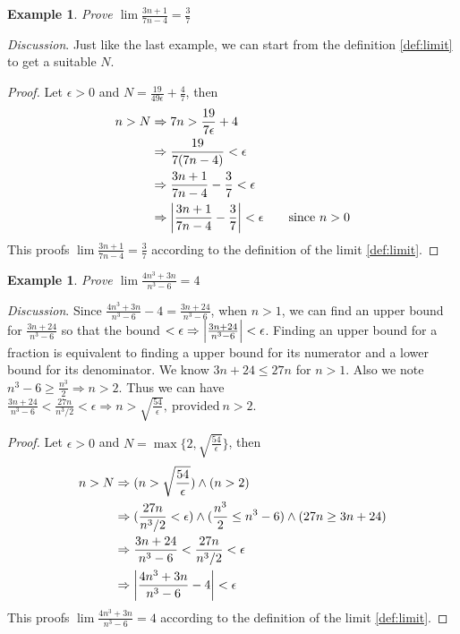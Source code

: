 \documentclass[12pt, lettersize]{book}
\newtheorem{eg}[thm]{Example}
\begin{document}
	\begin{eg}
		Prove $\lim \frac{3n+1}{7n-4}=\frac{3}{7}$
	\end{eg}
	\emph{Discussion}. Just like the last example, we can start from the definition \ref{def:limit} to get a suitable $N$.
	\begin{proof}
		Let $\epsilon>0$ and $N=\frac{19}{49\epsilon}+\frac{4}{7}$, then
		\begin{align*}
			n>N &\Rightarrow 7n>\frac{19}{7\epsilon}+4\\
			&\Rightarrow \frac{19}{7(7n-4)}<\epsilon\\
			&\Rightarrow \frac{3n+1}{7n-4} - \frac{3}{7}<\epsilon\\
			&\Rightarrow \abs{\frac{3n+1}{7n-4} - \frac{3}{7}}<\epsilon\qquad \text{since}\ n>0
		\end{align*}
		This proofs $\lim \frac{3n+1}{7n-4}=\frac{3}{7}$ according to the definition of the limit \ref{def:limit}.
	\end{proof}
	
	\begin{eg}
		Prove $\lim\frac{4n^3+3n}{n^3-6}=4$
	\end{eg}
	\emph{Discussion}. Since $\frac{4n^3+3n}{n^3-6}-4 = \frac{3n+24}{n^3-6}$, when $n>1$, we can find an upper bound for
	$\frac{3n+24}{n^3-6}$ so that the bound $<\epsilon \Rightarrow \abs{\frac{3n+24}{n^3-6}}<\epsilon$. Finding an upper bound for a fraction is equivalent to finding a upper bound for its numerator and a lower bound for its denominator.
	We know $3n+24\leq27n$ for $n>1$. Also we note $n^3-6\geq\frac{n^3}{2} \Rightarrow n>2$. Thus we can have $\frac{3n+24}{n^3-6}<\frac{27n}{n^3/2}<\epsilon \Rightarrow n>\sqrt{\frac{54}{\epsilon}},\ \text{provided}\ n>2$.
	\begin{proof}
		Let $\epsilon>0$ and $N=\max\{2,\sqrt{\frac{54}{\epsilon}}\}$, then
		\begin{align*}
			n>N &\Rightarrow (n>\sqrt{\frac{54}{\epsilon}})\land(n>2)\\
			&\Rightarrow (\frac{27n}{n^3/2}<\epsilon)\land(\frac{n^3}{2}\leq n^3-6)\land(27n\geq3n+24)\\
			&\Rightarrow \frac{3n+24}{n^3-6} < \frac{27n}{n^3/2} < \epsilon\\
			&\Rightarrow \abs{\frac{4n^3+3n}{n^3-6}-4} < \epsilon
		\end{align*}
		This proofs $\lim\frac{4n^3+3n}{n^3-6}=4$ according to the definition of the limit \ref{def:limit}.
	\end{proof}
	
\end{document}

